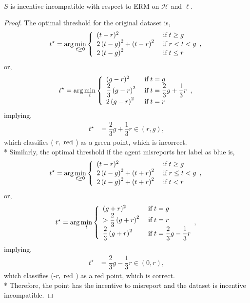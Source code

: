 \documentclass{article}
\def\H{\mathcal H}
\begin{document}
\begin{prop} \label{prop:ex1} 
$S$ is incentive incompatible with respect to ERM on $\H$ and $\ell$.
\end{prop}
\begin{proof} \label{proof:ex1pf} 
The optimal threshold for the original dataset is,
\[ t^\star  = \arg\displaystyle\min_{t \geq  0}\left\{ \begin{array}{ll}
(t - r)^{2}& \text{\;if\;} t \geq  g \\
2 \left(t - g\right)^{2} + \left(t - r\right)^{2}& \text{\;if\;} r < t < g \\
2 \left(t - g\right)^{2}& \text{\;if\;} t \leq  r \\
\end{array},\right. \]
or,
\[ t^\star  = \arg\displaystyle\min_{t}\left\{ \begin{array}{ll}
(g - r)^{2}& \text{\;if\;} t = g \\
\dfrac{2}{3} \left(g - r\right)^{2}& \text{\;if\;} t = \dfrac{2}{3} g + \dfrac{1}{3} r \\
2 \left(g - r\right)^{2}& \text{\;if\;} t = r \\
\end{array},\right. \]
implying,
\begin{align*}
t^\star  &= \dfrac{2}{3} g + \dfrac{1}{3} r \in \left(r , g \right),
\end{align*}
which classifies (-$r , \text{\;red\;}$) as a green point, which is incorrect.
\\* Similarly, the optimal threshold if the agent misreports her label as blue is,
\[ t^\star  = \arg\displaystyle\min_{t \geq  0}\left\{ \begin{array}{ll}
(t + r)^{2}& \text{\;if\;} t \geq  g \\
2 \left(t - g\right)^{2} + \left(t + r\right)^{2}& \text{\;if\;} r \leq  t < g \\
2 \left(t - g\right)^{2} + \left(t + r\right)^{2}& \text{\;if\;} t < r \\
\end{array},\right. \]
or,
\[ t^\star  = \arg\displaystyle\min_{t}\left\{ \begin{array}{ll}
(g + r)^{2}& \text{\;if\;} t = g \\
> \dfrac{2}{3} \left(g + r\right)^{2}& \text{\;if\;} t = r \\
\dfrac{2}{3} \left(g + r\right)^{2}& \text{\;if\;} t = \dfrac{2}{3} g - \dfrac{1}{3} r \\
\end{array},\right. \]
implying,
\begin{align*}
t^\star  &= \dfrac{2}{3} g - \dfrac{1}{3} r \in \left(0, r \right),
\end{align*}
which classifies (-$r , \text{\;red\;}$) as a red point, which is correct.
\\* Therefore, the point has the incentive to misreport and the dataset is incentive incompatible.
\newline \newline\end{proof}
\end{document}
